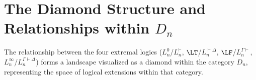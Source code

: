 																																																																											\section{The Diamond Structure and Relationships within $D_n$}
																																																																											
																																																																											The relationship between the four extremal logics ($L^0_n$/$L^{\vdash}_n$, $\LT$/$L^{\vdash\Delta}_n$, $\LF$/$L^{\Gamma\vdash}_n$, $L^\infty_n$/$L^{\Gamma\vdash\Delta}_n$) forms a landscape visualized as a diamond within the category $D_n$, representing the space of logical extensions within that category.
																																																																											
